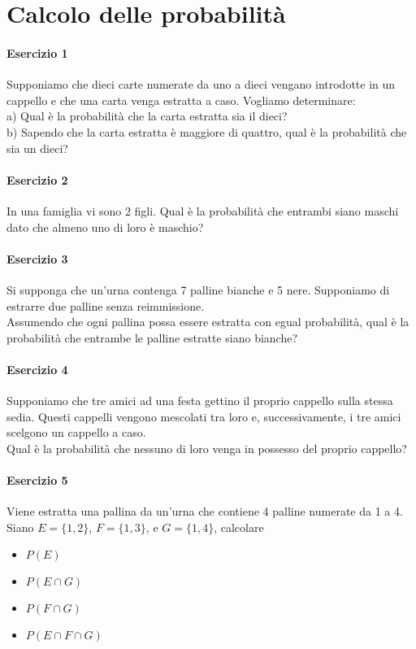 \documentclass[12pt]{article}
\title{}
\author{}
\date{}
\begin{document}
    \section{Calcolo delle probabilità}
    \paragraph{Esercizio 1}
    Supponiamo che dieci carte numerate da uno a dieci vengano introdotte in un cappello e che una carta venga estratta a caso. Vogliamo determinare: 
    \\a) Qual è la probabilità che la carta estratta sia il dieci? 
    \\b) Sapendo che la carta estratta è maggiore di quattro, qual è la probabilità che sia un dieci?
    \paragraph{Esercizio 2}
    In una famiglia vi sono 2 figli. Qual è la probabilità che entrambi siano maschi dato che almeno
    uno di loro è maschio?
    \paragraph{Esercizio 3}
    Si supponga che un’urna contenga 7 palline bianche e 5 nere. Supponiamo di estrarre due
    palline senza reimmissione. 
    \\ Assumendo che ogni pallina possa essere estratta con egual probabilità, qual è la probabilità che entrambe le palline estratte siano bianche?
    \paragraph{Esercizio 4}
    Supponiamo che tre amici ad una festa gettino il proprio cappello sulla stessa sedia. Questi cappelli vengono mescolati tra loro e, successivamente, i tre amici scelgono un cappello a caso.
    \\ Qual è la probabilità che nessuno di loro venga in possesso del proprio cappello?
    \newpage
    \paragraph{Esercizio 5}
    Viene estratta una pallina da un’urna che contiene 4 palline numerate da 1 a 4.
    \\Siano $E =\{1,2\}$, $F=\{1,3\}$, e $G=\{1,4\}$, calcolare
    \begin{itemize}
        \item $P(E)$
        \item $P(E \cap G)$
        \item $P(F \cap G)$
        \item $P(E \cap F \cap G)$
    \end{itemize}
\end{document}

